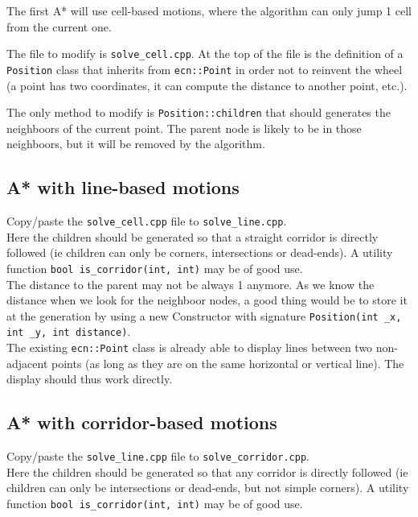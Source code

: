 \documentclass{ecnreport}
\begin{document}
The first A* will use cell-based motions, where the algorithm can only jump 1 cell from the current one.

The file to modify is \texttt{solve\_cell.cpp}.
At the top of the file is the definition of a \texttt{Position} class
that inherits from \texttt{ecn::Point} in order not to reinvent the wheel (a point has two coordinates, it can compute the distance to
another point, etc.).

The only method to modify is \texttt{Position::children} that should generates the neighboors of the current point.
The parent node is likely to be in those neighboors, but it will be removed by the algorithm. 

\subsection{A* with line-based motions}

Copy/paste the \texttt{solve\_cell.cpp} file to \texttt{solve\_line.cpp}.\\

Here the children should be generated so that a straight corridor is directly followed (ie children can only be corners, intersections or dead-ends).
A utility function \texttt{bool is\_corridor(int, int)} may be of good use.\\

The distance to the parent may not be always 1 anymore. As we know the distance when we look for the neighboor nodes, a good thing would be to store it 
at the generation by using a new Constructor with signature \texttt{Position(int \_x, int \_y, int distance)}.\\

The existing \texttt{ecn::Point} class is already able to display lines between two non-adjacent points (as long as they are on the same horizontal or
vertical line). The display should thus work directly.

\subsection{A* with corridor-based motions}

Copy/paste the \texttt{solve\_line.cpp} file to \texttt{solve\_corridor.cpp}.\\

Here the children should be generated so that any corridor is directly followed (ie children can only be intersections or dead-ends, but
not simple corners).
A utility function \texttt{bool is\_corridor(int, int)} may be of good use.\\
\end{document}
